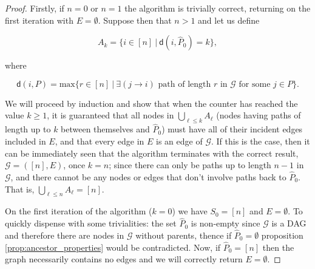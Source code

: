 \documentclass[12pt]{article}
\def\gcg{\mathcal{G}}  %
\newcommand{\dist}[2]{\mathsf{d}(#1, #2)}  %
\begin{document}
\begin{proof}

  Firstly, if $n = 0$ or $n = 1$ the algorithm is trivially correct, returning on the first iteration with $E = \emptyset$.  Suppose then that $n > 1$ and let us define

  \begin{equation*}
    A_k = \{i \in [n]\ |\ \dist{i}{\widehat{P}_0} = k\},
  \end{equation*}

  where

  \begin{equation*}
    \dist{i}{P} = \text{max}\{r \in [n]\ |\ \exists (j \rightarrow i) \text{ path of length } r \text{ in } \gcg \text{ for some } j \in P\}.
  \end{equation*}
  
  We will proceed by induction and show that when the counter has reached the value $k \ge 1$, it is guaranteed that all nodes in $\bigcup_{\ell \le k}A_\ell$ (nodes having paths of length up to $k$ between themselves and $\widehat{P}_0$) must have all of their incident edges included in $E$, and that every edge in $E$ is an edge of $\gcg$.  If this is the case, then it can be immediately seen that the algorithm terminates with the correct result, $\gcg = ([n], E)$, once $k = n$; since there can only be paths up to length $n - 1$ in $\gcg$, and there cannot be any nodes or edges that don't involve paths back to $\widehat{P}_0$.  That is, $\bigcup_{\ell \le n}A_\ell = [n]$.


  On the first iteration of the algorithm ($k = 0$) we have $S_0 = [n]$ and $E = \emptyset$.  To quickly dispense with some trivialities: the set $\widehat{P}_0$ is non-empty since $\gcg$ is a DAG and therefore there are nodes in $\gcg$ without parents, thence if $\widehat{P}_0 = \emptyset$ proposition \ref{prop:ancestor_properties} would be contradicted.  Now, if $\widehat{P}_0 = [n]$ then the graph necessarily contains no edges and we will correctly return $E = \emptyset$.


\end{proof}
\end{document}
